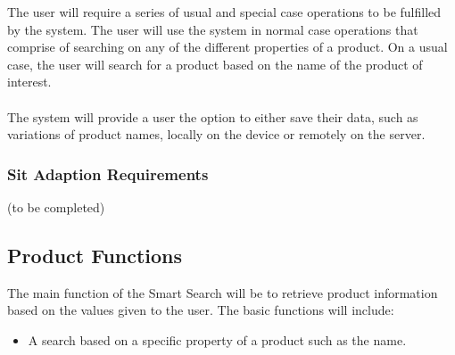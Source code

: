 \documentclass[a4paper,10pt]{article}
\begin{document}
            	{The user will require a series of usual and special case operations to be fulfilled by the system. The user will use the system in normal case operations that comprise of searching on any of the different properties of a product. On a usual case, the user will search for a product based on the name of the product of interest.\\\\
            	The system will provide a user the option to either save their data, such as variations of product names, locally on the device or remotely on the server.}
           \subsubsection{Sit Adaption Requirements}
        (to be completed)
		\subsection{Product Functions} {The main function of the Smart Search will be to retrieve product information based on the values given to the user. The basic functions will include:  }
	\begin{itemize}
  		\item A search based on a specific property of a product such as the name.
	\end{itemize}
\end{document}
